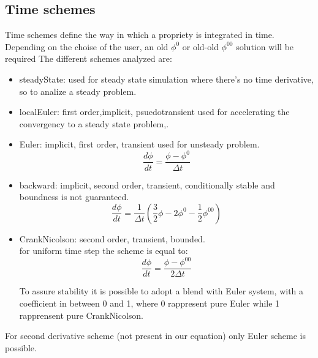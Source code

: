 \documentclass[a4paper,12pt]{article}
\begin{document}
\subsection{Time schemes}
Time schemes define the way in which a propriety is integrated in time. Depending on the choise of the user, an old $\phi^0$ or old-old $\phi^{00}$ solution will be required
The different schemes analyzed are:
\begin{itemize} 
 \item {\ttfamily steadyState}: used for steady state simulation where there's no time derivative, so to analize a steady problem.
 
 \item {\ttfamily localEuler}: first order,implicit, psuedotransient used for accelerating the convergency to a steady state problem,.
 
 \item {\ttfamily Euler}: implicit, first order, transient used for unsteady problem.
\begin{equation}
\frac{d \phi}{dt} = \frac{\phi - \phi^0}{\Delta t}
\end{equation} 

 
 \item {\ttfamily backward}: implicit, second order, transient, conditionally stable and boundness is not guaranteed.
\begin{equation}
\frac{d \phi}{dt} = \frac{1}{\Delta t}\left(\frac{3}{2}\phi - 2\phi^0- \frac{1}{2}\phi^{00}\right)
\end{equation} 
 
 \item {\ttfamily CrankNicolson}: second order, transient, bounded. \\for uniform time step the scheme is equal to:
\begin{equation}
 \frac{d \phi}{dt} = \frac{\phi - \phi^{00}}{2\Delta t}
\end{equation} 
 
To assure stability it is possible to adopt a blend with Euler system, with a coefficient in between 0 and 1, where 0 rappresent pure Euler while 1 rapprensent pure CrankNicolson.
 
 \end{itemize} 
 For second derivative scheme (not present in our equation) only Euler scheme is possible.
\end{document}

